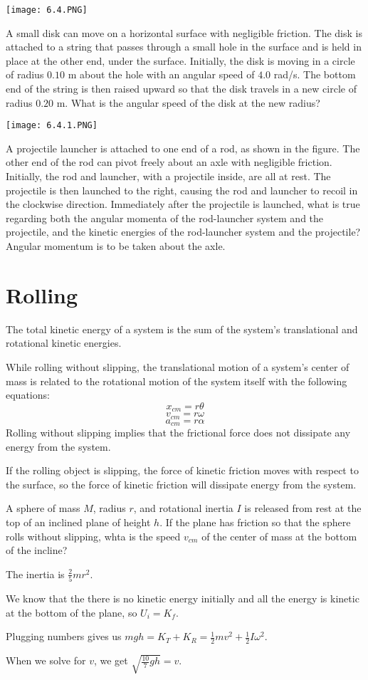 \documentclass[../mech.tex]{subfiles}
\begin{document}
\ex \begin{center}
    \texttt{[image: 6.4.PNG]}
\end{center}
A small disk can move on a horizontal surface with negligible friction. The disk is attached to a string that passes through a small hole in the surface and is held in place at the other end, under the surface.
Initially, the disk is moving in a circle of radius $0.10$ m about the hole with an angular speed of $4.0$ rad/s. The bottom end of the string is then raised upward so that the disk travels in a new circle of radius $0.20$ m. What is the angular speed of the disk at the new radius?

\ex \begin{center}
    \texttt{[image: 6.4.1.PNG]}
\end{center}
A projectile launcher is attached to one end of a rod, as shown in the figure. The other end of the rod can pivot freely about an axle with negligible friction. Initially, the rod and launcher, with a projectile inside, are all at rest. The projectile is then launched to the right, 
causing the rod and launcher to recoil in the clockwise direction. Immediately after the projectile is launched, what is true regarding both the angular momenta of the rod-launcher system and the projectile, and the kinetic energies of the rod-launcher system and the projectile? Angular momentum is to be taken about the axle.
\pagebreak
\section{Rolling}
The total kinetic energy of a system is the sum of the system's translational and rotational kinetic energies.

While rolling without slipping, the translational motion of a system's center of mass is related to the rotational motion of the system itself with the following equations:
\[ x_{cm}=r\theta \]
\[ v_{cm} = r\omega \]
\[ a_{cm}=r\alpha \]
Rolling without slipping implies that the frictional force does not dissipate any energy from the system.

If the rolling object is slipping, the force of kinetic friction moves with respect to the surface, so the force of kinetic friction will dissipate energy from the system.

\begin{example}
    A sphere of mass $M$, radius $r$, and rotational inertia $I$ is released from rest at the top of an inclined plane of height $h$. If the plane has friction so that the sphere rolls without slipping, whta is the speed $v_{cm}$ of the center of mass at the bottom of the incline?

    The inertia is $\frac{2}{5}mr^2$.

    We know that the there is no kinetic energy initially and all the energy is kinetic at the bottom of the plane, so $U_i=K_f$.

    Plugging numbers gives us $mgh=K_T+K_R=\frac{1}{2}mv^2+\frac{1}{2}I\omega^2$.

    When we solve for $v$, we get $\sqrt{\frac{10}{7}gh}=v$.
\end{example}
\end{document}
